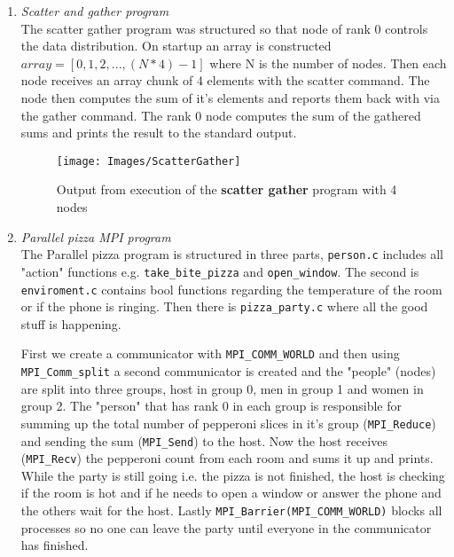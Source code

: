 \documentclass[fontsize=14pt,a4paper]{scrartcl}
\begin{document}
\begin{enumerate}
\begin{enumerate}[label*=\arabic*.]
    \item
    \textit{Scatter and gather program}\\
    The scatter gather program was structured so that node of rank 0 controls the data distribution. On startup an array is constructed $array = [0, 1, 2, ..., (N * 4) - 1]$ where N is the number of nodes. Then each node receives an array chunk of 4 elements with the scatter command. The node then computes the sum of it’s elements and reports them back with via the gather command. The rank 0 node computes the sum of the gathered sums and prints the result to the standard output.
    \begin{figure}[H]
        \centering
        \texttt{[image: Images/ScatterGather]}
        \caption{Output from execution of the \textbf{scatter gather} program with 4 nodes}
    \end{figure}

    \item
    \textit{Parallel pizza MPI program}\\
    
    The Parallel pizza program is structured in three parts, \texttt{person.c} includes all "action" functions e.g. \texttt{take\_bite\_pizza} and \texttt{open\_window}. The second is \texttt{enviroment.c} contains bool functions regarding the temperature of the room or if the phone is ringing. Then there is \texttt{pizza\_party.c} where all the good stuff is happening. 
    
First we create a communicator with \texttt{MPI\_COMM\_WORLD} and then using \texttt{MPI\_Comm\_split} a second communicator is created and the "people" (nodes) are split into three groups, host in group 0, men in group 1 and women in group 2. The "person" that has rank 0 in each group is responsible for summing up the total number of pepperoni slices in it's group (\texttt{MPI\_Reduce}) and sending the sum (\texttt{MPI\_Send}) to the host. Now the host receives (\texttt{MPI\_Recv}) the pepperoni count from each room and sums it up and prints. While the party is still going i.e. the pizza is not finished, the host is checking if the room is hot and if he needs to open a window or answer the phone and the others wait for the host. Lastly \texttt{MPI\_Barrier(MPI\_COMM\_WORLD)} blocks all processes so no one can leave the party until everyone in the communicator has finished. 

    \end{enumerate}
\end{enumerate}
\end{document}
